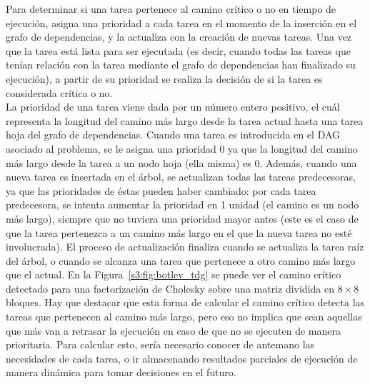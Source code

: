 Para determinar si una tarea pertenece al camino crítico o no en tiempo de
ejecución, \botlev asigna una prioridad a cada tarea en el momento de la
inserción en el grafo de dependencias, y la actualiza con la creación de
nuevas tareas. Una vez que la tarea está lista para ser ejecutada (es
decir, cuando todas las tareas que tenían relación con la tarea mediante el
grafo de dependencias han finalizado su ejecución), a partir de su
prioridad se realiza la decisión de si la tarea es considerada crítica o no.\\
La prioridad de una tarea viene dada por un número entero positivo, el cuál
representa la longitud del camino más largo desde la tarea actual hasta una
tarea hoja del grafo de dependencias. Cuando una tarea es introducida en el
DAG asociado al problema, se le asigna una prioridad 0 ya que la longitud
del camino más largo desde la tarea a un nodo hoja (ella misma) es
0. Además, cuando una nueva tarea es insertada en el árbol, se actualizan
todas las tareas predecesoras, ya que las prioridades de éstas pueden haber
cambiado: por cada tarea predecesora, se intenta aumentar la prioridad en 1
unidad (el camino es un nodo más largo), siempre que no tuviera una
prioridad mayor antes (este es el caso de que la tarea pertenezca a un
camino más largo en el que la nueva tarea no esté involucrada). El proceso
de actualización finaliza cuando se actualiza la tarea raíz del árbol, o
cuando se alcanza una tarea que pertenece a otro camino más largo que el
actual. En la Figura~\ref{s3:fig:botlev_tdg} se puede ver el camino crítico
detectado para una factorización de Cholesky sobre una matriz dividida en
$8\times8$ bloques. Hay que destacar que esta forma de calcular el camino
crítico detecta las tareas que pertenecen al camino más largo, pero eso no
implica que sean aquellas que más van a retrasar la ejecución en caso de
que no se ejecuten de manera prioritaria. Para calcular esto, sería
necesario conocer de antemano las necesidades de cada tarea, o ir
almacenando resultados parciales de ejecución de manera dinámica para tomar
decisiones en el futuro.

